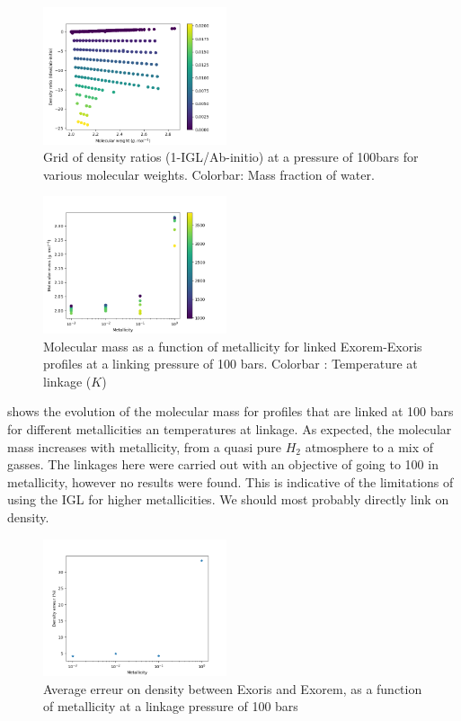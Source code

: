 \begin{figure}
    \centering
    \includegraphics[width=0.48\textwidth]{Images/EOS_comparaison_grid.png}
    \caption{Grid of density ratios (1-IGL/Ab-initio) at a pressure of 100bars for various molecular weights. Colorbar: Mass fraction of water.}
    \label{fig:EOS_comp_grid}
\end{figure}

\begin{figure}
    \centering
    \includegraphics[width=0.48\textwidth]{Images/MM_Met.png}
    \caption{Molecular mass as a function of metallicity for linked Exorem-Exoris profiles at a linking pressure of 100 bars. Colorbar : Temperature at linkage ($K$)}
    \label{fig:MM_Met}
\end{figure}

 shows the evolution of the molecular mass for profiles that are linked at 100 bars for different metallicities an temperatures at linkage. As expected, the molecular mass increases with metallicity, from a quasi pure $H_2$ atmosphere to a mix of gasses. The linkages here were carried out with an objective of going to 100 in metallicity, however no results were found. This is indicative of the limitations of using the IGL for higher metallicities. We should most probably directly link on density.

\begin{figure}
    \centering
    \includegraphics[width=0.48\textwidth]{Images/Met_rhoerr.png}
    \caption{Average erreur on density between Exoris and Exorem, as a function of metallicity at a linkage pressure of 100 bars}
    \label{fig:rhoerr_Met}
\end{figure}

